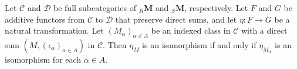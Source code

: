 Let $\mathcal{C}$ and $\mathcal{D}$ be full subcategories of ${}_R \mathbf{M}$ and ${}_S \mathbf{M}$, respectively. Let $F$ and $G$ be additive functors from $\mathcal{C}$ to $\mathcal{D}$ that preserve direct sums, and let $\eta: F \to G$ be a natural transformation. Let $(M_\alpha)_{\alpha \in A}$ be an indexed class in $\mathcal{C}$ with a direct sum $(M, (\iota_\alpha)_{\alpha \in A})$ in $\mathcal{C}$. Then $\eta_M$ is an isomorphism if and only if $\eta_{M_\alpha}$ is an isomorphism for each $\alpha \in A$.
